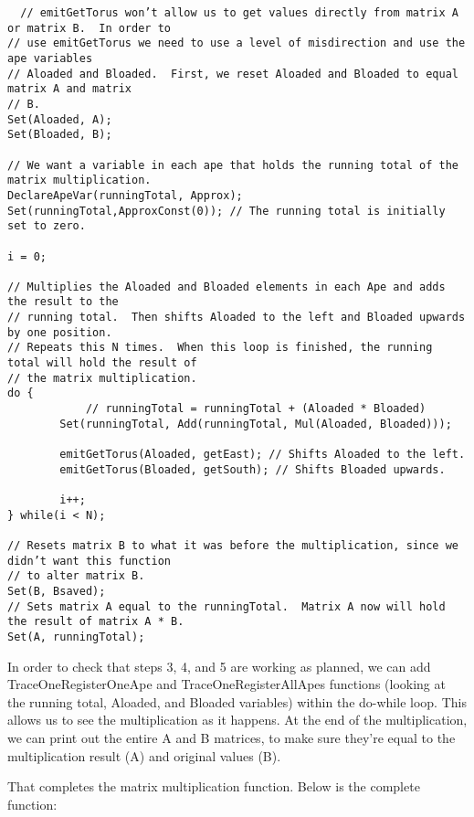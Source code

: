 \documentclass[10pt]{article}
\begin{document}
\begin{verbatim}
  // emitGetTorus won’t allow us to get values directly from matrix A or matrix B.  In order to
// use emitGetTorus we need to use a level of misdirection and use the ape variables
// Aloaded and Bloaded.  First, we reset Aloaded and Bloaded to equal matrix A and matrix
// B.
Set(Aloaded, A);
Set(Bloaded, B);
 
// We want a variable in each ape that holds the running total of the matrix multiplication.
DeclareApeVar(runningTotal, Approx);
Set(runningTotal,ApproxConst(0)); // The running total is initially set to zero.

i = 0;

// Multiplies the Aloaded and Bloaded elements in each Ape and adds the result to the
// running total.  Then shifts Aloaded to the left and Bloaded upwards by one position. 
// Repeats this N times.  When this loop is finished, the running total will hold the result of
// the matrix multiplication.
do {
            // runningTotal = runningTotal + (Aloaded * Bloaded)
        Set(runningTotal, Add(runningTotal, Mul(Aloaded, Bloaded)));

        emitGetTorus(Aloaded, getEast); // Shifts Aloaded to the left.
        emitGetTorus(Bloaded, getSouth); // Shifts Bloaded upwards.

        i++;
} while(i < N);

// Resets matrix B to what it was before the multiplication, since we didn’t want this function
// to alter matrix B.
Set(B, Bsaved);
// Sets matrix A equal to the runningTotal.  Matrix A now will hold the result of matrix A * B.
Set(A, runningTotal);
\end{verbatim}

In order to check that steps 3, 4, and 5 are working as planned, we can add TraceOneRegisterOneApe and TraceOneRegisterAllApes functions (looking at the running total, Aloaded, and Bloaded variables) within the do-while loop.  This allows us to see the multiplication as it happens.  At the end of the multiplication, we can print out the entire A and B matrices, to make sure they’re equal to the multiplication result (A) and original values (B). \par
That completes the matrix multiplication function.  Below is the complete function: \par

\inputminted{c}{mm-emitMatrixMul.c}
\end{document}
